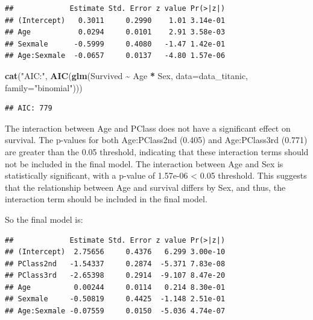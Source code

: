 \documentclass[
  11pt,
]{article}
\newenvironment{Shaded}{\begin{snugshade}}{\end{snugshade}}
\newcommand{\AttributeTok}[1]{\textcolor[rgb]{0.13,0.29,0.53}{#1}}
\newcommand{\FunctionTok}[1]{\textcolor[rgb]{0.13,0.29,0.53}{\textbf{#1}}}
\newcommand{\NormalTok}[1]{#1}
\newcommand{\OtherTok}[1]{\textcolor[rgb]{0.56,0.35,0.01}{#1}}
\newcommand{\SpecialCharTok}[1]{\textcolor[rgb]{0.81,0.36,0.00}{\textbf{#1}}}
\newcommand{\StringTok}[1]{\textcolor[rgb]{0.31,0.60,0.02}{#1}}
\begin{document}
\begin{verbatim}
##             Estimate Std. Error z value Pr(>|z|)
## (Intercept)   0.3011     0.2990    1.01 3.14e-01
## Age           0.0294     0.0101    2.91 3.58e-03
## Sexmale      -0.5999     0.4080   -1.47 1.42e-01
## Age:Sexmale  -0.0657     0.0137   -4.80 1.57e-06
\end{verbatim}

\begin{Shaded}
\begin{Highlighting}[]
\FunctionTok{cat}\NormalTok{(}\StringTok{"AIC:"}\NormalTok{, }\FunctionTok{AIC}\NormalTok{(}\FunctionTok{glm}\NormalTok{(Survived }\SpecialCharTok{\textasciitilde{}}\NormalTok{ Age }\SpecialCharTok{*}\NormalTok{ Sex, }\AttributeTok{data=}\NormalTok{data\_titanic, }\AttributeTok{family=}\StringTok{"binomial"}\NormalTok{)))}
\end{Highlighting}
\end{Shaded}

\begin{verbatim}
## AIC: 779
\end{verbatim}

The interaction between Age and PClass does not have a significant
effect on survival. The p-values for both Age:PClass2nd (0.405) and
Age:PClass3rd (0.771) are greater than the 0.05 threshold, indicating
that these interaction terms should not be included in the final model.
The interaction between Age and Sex is statistically significant, with a
p-value of 1.57e-06 \textless{} 0.05 threshold. This suggests that the
relationship between Age and survival differs by Sex, and thus, the
interaction term should be included in the final model.

So the final model is:

\begin{Shaded}
\end{Shaded}

\begin{verbatim}
##             Estimate Std. Error z value Pr(>|z|)
## (Intercept)  2.75656     0.4376   6.299 3.00e-10
## PClass2nd   -1.54337     0.2874  -5.371 7.83e-08
## PClass3rd   -2.65398     0.2914  -9.107 8.47e-20
## Age          0.00244     0.0114   0.214 8.30e-01
## Sexmale     -0.50819     0.4425  -1.148 2.51e-01
## Age:Sexmale -0.07559     0.0150  -5.036 4.74e-07
\end{verbatim}
\end{document}
